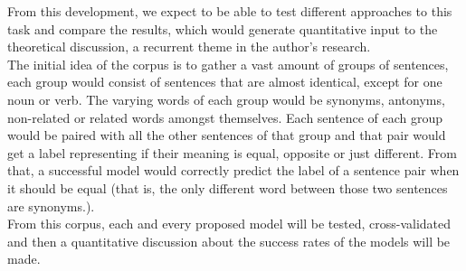 \documentclass[runningheads]{llncs}
\begin{document}
From this development, we expect to be able to test different approaches to this task and compare the results, which would generate quantitative input to the theoretical discussion, a recurrent theme in the author's research.\\

The initial idea of the corpus is to gather a vast amount of groups of sentences, each group would consist of sentences that are almost identical, except for one noun or verb. The varying words of each group would be synonyms, antonyms, non-related or related words amongst themselves. Each sentence of each group would be paired with all the other sentences of that group and that pair would get a label representing if their meaning is equal, opposite or just different. From that, a successful model would correctly predict the label of a sentence pair when it should be equal (that is, the only different word between those two sentences are synonyms.).\\

From this corpus, each and every proposed model will be tested, cross-validated and then a quantitative discussion about the success rates of the models will be made.\\



%
%
%
 
 
%
\end{document}
